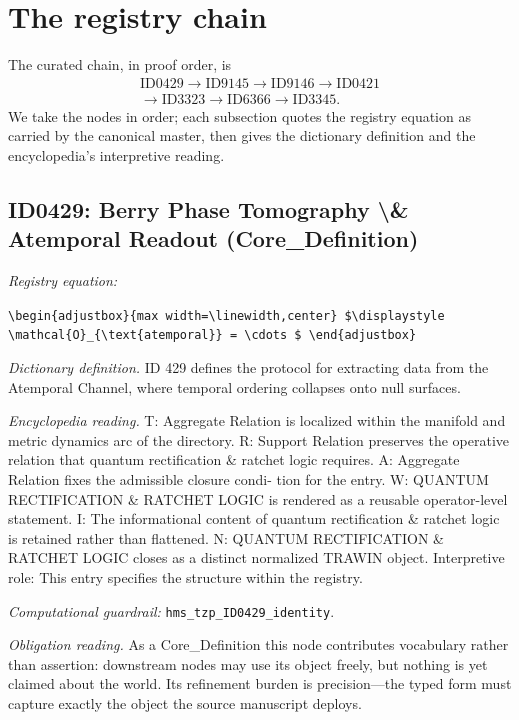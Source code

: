 \documentclass[11pt]{article}
\theoremstyle{remark}
\begin{document}
\section{The registry chain}
\label{sec:chain}

The curated chain, in proof order, is
\begin{equation*}
\begin{gathered}
\text{ID0429} \to \text{ID9145} \to \text{ID9146} \to \text{ID0421} \\
\to \text{ID3323} \to \text{ID6366} \to \text{ID3345}.
\end{gathered}
\end{equation*}
We take the nodes in order; each subsection quotes the registry equation as carried by the canonical master, then gives the dictionary definition and the encyclopedia's interpretive reading.

\subsection{ID0429: Berry Phase Tomography \textbackslash{}\& Atemporal Readout (Core\_Definition)}

\noindent\textit{Registry equation:}\par
{\small\texttt{\textbackslash{}begin\{adjustbox\}\{max width=\textbackslash{}linewidth,center\} \$\textbackslash{}displaystyle \textbackslash{}mathcal\{O\}\_\{\textbackslash{}text\{atemporal\}\} = \textbackslash{}cdots \$ \textbackslash{}end\{adjustbox\}}}\par\medskip
\noindent\textit{Dictionary definition.} ID 429 defines the protocol for extracting data from the Atemporal Channel, where temporal ordering collapses onto null surfaces.\par\medskip
\noindent\textit{Encyclopedia reading.} T: Aggregate Relation is localized within the manifold and metric dynamics arc of the directory. R: Support Relation preserves the operative relation that quantum rectification \& ratchet logic requires. A: Aggregate Relation fixes the admissible closure condi- tion for the entry. W: QUANTUM RECTIFICATION \& RATCHET LOGIC is rendered as a reusable operator-level statement. I: The informational content of quantum rectification \& ratchet logic is retained rather than flattened. N: QUANTUM RECTIFICATION \& RATCHET LOGIC closes as a distinct normalized TRAWIN object. Interpretive role: This entry specifies the structure within the registry.
\par\medskip\noindent\textit{Computational guardrail:} \texttt{hms\_tzp\_ID0429\_identity}.
\par\medskip\noindent\textit{Obligation reading.} As a Core\_Definition this node contributes vocabulary rather than assertion: downstream nodes may use its object freely, but nothing is yet claimed about the world. Its refinement burden is precision---the typed form must capture exactly the object the source manuscript deploys.
\end{document}
